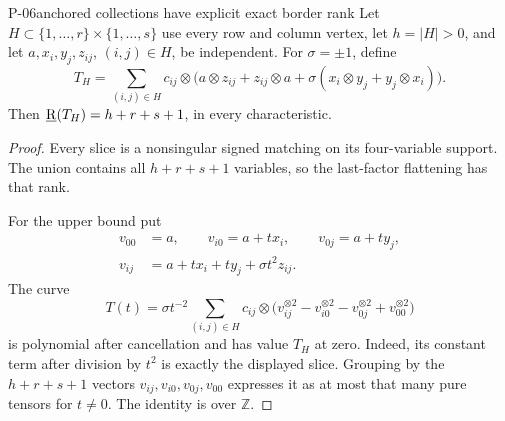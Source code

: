 \begin{finding}{P-06}{anchored collections have explicit exact border rank}
Let \(H\subset\{1,\ldots,r\}\times\{1,\ldots,s\}\) use every
row and column vertex, let \(h=|H|>0\), and let
\(a,x_i,y_j,z_{ij}\), \((i,j)\in H\), be independent.
For \(\sigma=\pm1\), define
\[
 T_H=\sum_{(i,j)\in H}c_{ij}\otimes
 \bigl(a\otimes z_{ij}+z_{ij}\otimes a
       +\sigma(x_i\otimes y_j+y_j\otimes x_i)\bigr).
\]
Then \(\underline{\mathrm R}(T_H)=h+r+s+1\), in every characteristic.
\end{finding}
\begin{proof}
Every slice is a nonsingular signed matching on its
four-variable support. The union contains all
\(h+r+s+1\) variables, so the last-factor flattening has
that rank.

For the upper bound put
\[
 \begin{split}
 v_{00}&=a,\qquad v_{i0}=a+t x_i,\qquad v_{0j}=a+t y_j,\\
 v_{ij}&=a+t x_i+t y_j+\sigma t^2z_{ij}.
 \end{split}
\]
The curve
\[
 T(t)=\sigma t^{-2}\sum_{(i,j)\in H}c_{ij}\otimes
 \bigl(v_{ij}^{\otimes2}-v_{i0}^{\otimes2}
       -v_{0j}^{\otimes2}+v_{00}^{\otimes2}\bigr)
\]
is polynomial after cancellation and has value \(T_H\) at
zero. Indeed, its constant term after division by \(t^2\)
is exactly the displayed slice. Grouping by the \(h+r+s+1\)
vectors \(v_{ij},v_{i0},v_{0j},v_{00}\) expresses it as at
most that many pure tensors for \(t\ne0\).
The identity is over \(\mathbb Z\).
\end{proof}

